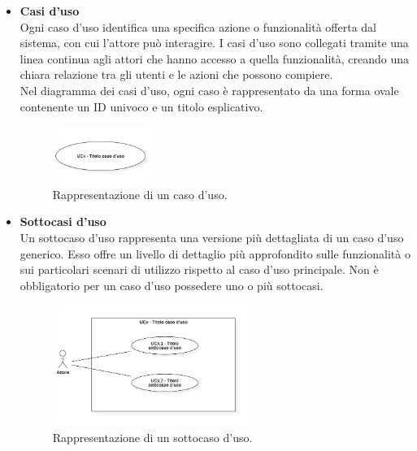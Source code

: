 \documentclass[10pt]{article}
\begin{document}
\begin{justify}
\begin{itemize}
            \item \textbf{Casi d'uso}\\
            Ogni caso d'uso identifica una specifica azione o funzionalità offerta dal sistema, con cui l'attore può interagire. I casi d'uso sono collegati tramite una linea continua agli attori che hanno accesso a quella funzionalità, creando una chiara relazione tra gli utenti e le azioni che possono compiere.\\
            Nel diagramma dei casi d'uso, ogni caso è rappresentato da una forma ovale contenente un ID univoco e un titolo esplicativo.
            \begin{figure}[H]
            \centering
            \includegraphics[width=0.30\textwidth]{UC.PNG}
            \caption{Rappresentazione di un caso d'uso.}
            \end{figure}

            \item \textbf{Sottocasi d'uso}\\
            Un sottocaso d'uso rappresenta una versione più dettagliata di un caso d'uso  generico. Esso offre un livello di dettaglio più approfondito sulle funzionalità o sui particolari scenari di utilizzo rispetto al caso d'uso principale. Non è obbligatorio per un caso d'uso possedere uno o più sottocasi.
            \begin{figure}[H]
            \centering
            \includegraphics[width=0.6\textwidth]{SottoUC.PNG}
            \caption{Rappresentazione di un sottocaso d'uso.}
            \end{figure}


\end{itemize}
\end{justify}
\end{document}
